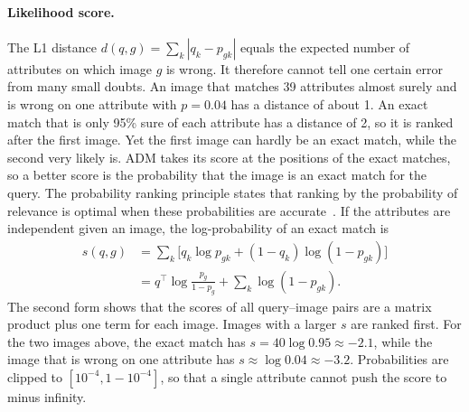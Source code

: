 \documentclass[10pt,twocolumn,letterpaper]{article}
\begin{document}
\paragraph{Likelihood score.} The L1 distance $d(q,g)=\sum_k|q_k-p_{gk}|$ equals the expected number of attributes on which image $g$ is wrong. It therefore cannot tell one certain error from many small doubts. An image that matches 39 attributes almost surely and is wrong on one attribute with $p=0.04$ has a distance of about 1. An exact match that is only 95\% sure of each attribute has a distance of 2, so it is ranked after the first image. Yet the first image can hardly be an exact match, while the second very likely is. ADM takes its score at the positions of the exact matches, so a better score is the probability that the image is an exact match for the query. The probability ranking principle states that ranking by the probability of relevance is optimal when these probabilities are accurate~\cite{prp}. If the attributes are independent given an image, the log-probability of an exact match is
\begin{equation}
\begin{aligned}
s(q,g)&=\sum_{k}\big[q_k\log p_{gk}+(1-q_k)\log(1-p_{gk})\big]\\
&=q^\top\log\frac{p_g}{1-p_g}+\sum_k\log(1-p_{gk}).
\end{aligned}
\label{eq:ll}
\end{equation}
The second form shows that the scores of all query--image pairs are a matrix product plus one term for each image. Images with a larger $s$ are ranked first. For the two images above, the exact match has $s=40\log0.95\approx-2.1$, while the image that is wrong on one attribute has $s\approx\log0.04\approx-3.2$. Probabilities are clipped to $[10^{-4},1-10^{-4}]$, so that a single attribute cannot push the score to minus infinity.
\end{document}

